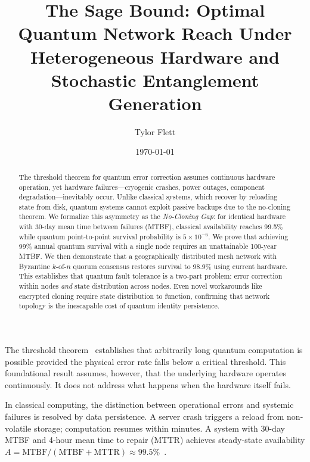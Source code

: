 \documentclass[aps,prl,twocolumn,superscriptaddress,showpacs]{revtex4-2}
\begin{document}
\title{The Sage Bound: Optimal Quantum Network Reach Under Heterogeneous Hardware and Stochastic Entanglement Generation}

\author{Tylor Flett}

\date{\today}

\begin{abstract}
The threshold theorem for quantum error correction assumes continuous hardware operation, yet hardware failures—cryogenic crashes, power outages, component degradation—inevitably occur. Unlike classical systems, which recover by reloading state from disk, quantum systems cannot exploit passive backups due to the no-cloning theorem. We formalize this asymmetry as the \textit{No-Cloning Gap}: for identical hardware with 30-day mean time between failures (MTBF), classical availability reaches 99.5\% while quantum point-to-point survival probability is $5 \times 10^{-6}$. We prove that achieving 99\% annual quantum survival with a single node requires an unattainable 100-year MTBF. We then demonstrate that a geographically distributed mesh network with Byzantine $k$-of-$n$ quorum consensus restores survival to 98.9\% using current hardware. This establishes that quantum fault tolerance is a two-part problem: error correction within nodes \textit{and} state distribution across nodes. Even novel workarounds like encrypted cloning require state distribution to function, confirming that network topology is the inescapable cost of quantum identity persistence.
\end{abstract}

\maketitle


The threshold theorem~\cite{aharonov1997,knill1998,kitaev2003} establishes that arbitrarily long quantum computation is possible provided the physical error rate falls below a critical threshold. This foundational result assumes, however, that the underlying hardware operates continuously. It does not address what happens when the hardware itself fails.

In classical computing, the distinction between operational errors and systemic failures is resolved by data persistence. A server crash triggers a reload from non-volatile storage; computation resumes within minutes. A system with 30-day MTBF and 4-hour mean time to repair (MTTR) achieves steady-state availability $A = \text{MTBF}/(\text{MTBF} + \text{MTTR}) \approx 99.5\%$~\cite{patterson2002}.
\end{document}
